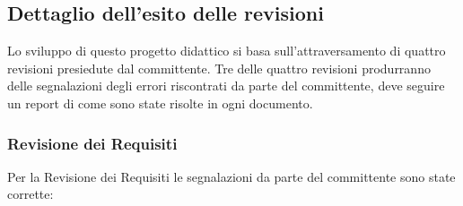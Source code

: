 	 	
	 	
	 
	 
	\subsection{Dettaglio dell'esito delle revisioni}
	Lo sviluppo di questo progetto didattico si basa sull'attraversamento di quattro revisioni presiedute dal committente. Tre delle quattro revisioni produrranno delle segnalazioni degli errori riscontrati da parte del committente, deve seguire un report di come sono state risolte in ogni documento.
		
		\subsubsection{Revisione dei Requisiti}
		Per la Revisione dei Requisiti le segnalazioni da parte del committente sono state corrette:
		
